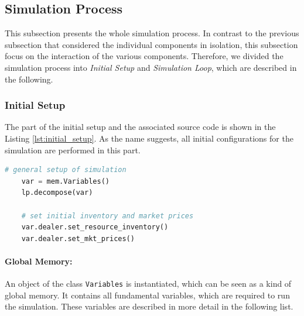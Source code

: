 \subsection{Simulation Process}
This subsection presents the whole simulation process. 
In contrast to the previous subsection that 
considered the individual components in isolation, this subsection focus 
on the interaction of the various components.
Therefore, we divided the simulation process into 
\textit{Initial Setup} and \textit{Simulation Loop},
which are described in the following.

\subsubsection{Initial Setup}
The part of the initial setup and the associated source code is shown in the Listing \ref{lst:initial_setup}.
As the name suggests, all initial configurations for the simulation are performed in this part.

\begin{lstlisting}[float=htbp, label=lst:initial_setup, caption=Initial Setup of Simulation, language=Python]
    # general setup of simulation
    var = mem.Variables()
    lp.decompose(var)

    # set initial inventory and market prices
    var.dealer.set_resource_inventory()
    var.dealer.set_mkt_prices()  
\end{lstlisting}

\paragraph{Global Memory:} An object of the class \verb|Variables| is instantiated, which 
can be seen as a kind of global memory.
It contains all fundamental variables, which are required to run the simulation.
These variables are described in more detail in the following list.

